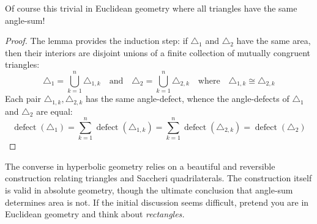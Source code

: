 Of course this trivial in Euclidean geometry where all triangles have the same angle-sum!

\begin{proof}
	The lemma provides the induction step: if $\triangle_1$ and $\triangle_2$ have the same area, then their interiors are disjoint unions of a finite collection of mutually congruent triangles:
	\[
		\triangle_1=\bigcup_{k=1}^n\triangle_{1,k}\quad\text{and}\quad \triangle_2=\bigcup_{k=1}^n\triangle_{2,k}\quad\text{where}\quad \triangle_{1,k}\cong\triangle_{2,k}
	\]
	Each pair $\triangle_{1,k},\triangle_{2,k}$ has the same angle-defect, whence the angle-defects of $\triangle_1$ and $\triangle_2$ are equal:
	\[
		\operatorname{defect}(\triangle_1)=\sum_{k=1}^n\operatorname{defect}(\triangle_{1,k}) =\sum_{k=1}^n\operatorname{defect}(\triangle_{2,k}) =\operatorname{defect}(\triangle_2)\tag*{\qedhere}
	\]
\end{proof}

\goodbreak



The converse in hyperbolic geometry relies on a beautiful and reversible construction relating triangles and Saccheri quadrilaterals. The construction itself is valid in absolute geometry, though the ultimate conclusion that angle-sum determines area is not. If the initial discussion seems difficult, pretend you are in Euclidean geometry and think about \emph{rectangles.}

